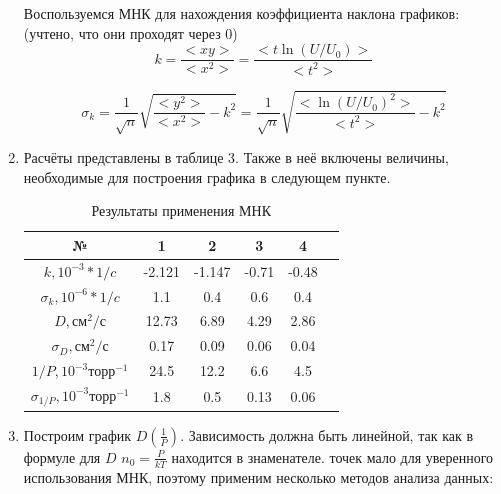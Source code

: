 \documentclass[a4paper,12pt]{article}
\begin{document}
\begin{enumerate}
Воспользуемся МНК для нахождения коэффициента наклона графиков: (учтено, что они проходят через 0)
\begin{equation}
    k = \frac{<xy>}{<x^2>} = \frac{<t\ln(U/U_0)>}{<t^2>}
\end{equation}

\begin{equation}
    \sigma_k = \frac{1}{\sqrt{n}}\sqrt{\frac{<y^2>}{<x^2>} - k^2} =
    \frac{1}{\sqrt{n}}\sqrt{\frac{<\ln(U/U_0)^2>}{<t^2>} - k^2}
\end{equation}

\item Расчёты представлены в таблице 3. Также в неё включены величины, необходимые для построения графика в следующем пункте.
\begin{center}
 \begin{table}[hb]
    \centering
    \caption{Результаты применения МНК}
    \begin{tabular}{|c|c|c|c|c|c|}
    \hline
    № & 1 & 2 & 3 & 4 \\ \hline
    $k, 10^{-3} * 1/c$ & -2.121 & -1.147 & -0.71 & -0.48 \\ \hline
    $\sigma_k, 10^{-6}*1/c$ & 1.1 & 0.4 & 0.6  & 0.4 \\ \hline
    $D, \text{см}^2/\text{с}$ & 12.73 & 6.89 & 4.29 & 2.86 \\ \hline
    $\sigma_D, \text{см}^2/\text{с}$ & 0.17 & 0.09 & 0.06 & 0.04 \\ \hline
    $ 1/P, 10^{-3}\text{торр}^{-1}$ & 24.5 & 12.2 & 6.6 & 4.5 \\ \hline
    $ \sigma_{1/P}, 10^{-3}\text{торр}^{-1}$ & 1.8 & 0.5 & 0.13 & 0.06 \\ \hline
    \end{tabular}
    \end{table}
\end{center}


\item Построим график $D(\frac{1}{P})$. \newline
Зависимость должна быть линейной, так как в формуле для $D$ $n_0 = \frac{P}{kT}$ находится в знаменателе.  точек мало для уверенного использования МНК, поэтому применим несколько методов анализа данных:


\end{enumerate}
\end{document}
